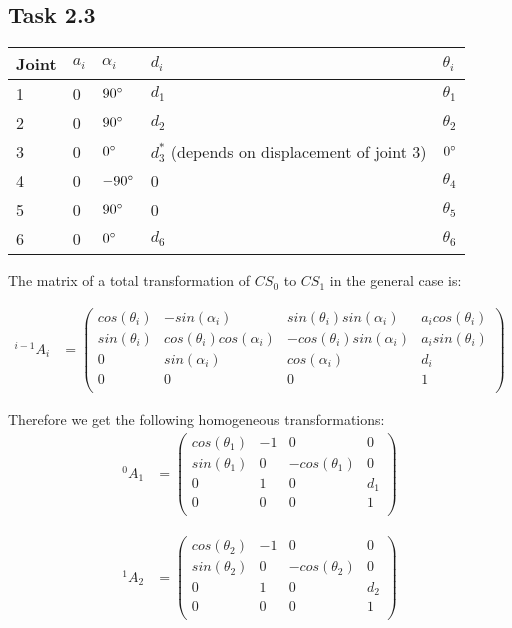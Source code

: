 \subsection*{Task 2.3}

\begin{center}
	\begin{tabular}{ | l | l | l | l | l |}
		\hline
		Joint & $a_{i}$ & $\alpha_{i}$ & $d_i$ & $\theta_i$ \\ \hline
		1 & 0 & $90\degree$ & $d_1$ & $\theta_1$\\ \hline
		2 & 0 & $90\degree$ & $d_2$ & $\theta_2$\\ \hline
		3 & 0 & $0\degree$ & $d^*_3$ (depends on displacement of joint 3) & $0\degree$\\ \hline
		4 & 0 & $-90\degree$ & 0 & $\theta_4$\\ \hline
		5 & 0 & $90\degree$ & 0 & $\theta_5$\\ \hline
		6 & 0 & $0\degree$ & $d_6$ & $\theta_6$\\ \hline
	\end{tabular}
\end{center}

The matrix of a total transformation of $CS_0$ to $CS_1$ in the general case is:

\begin{align*}
^{i-1}A_i &= 
\begin{pmatrix}
cos(\theta_i) & -sin(\alpha_i) & sin(\theta_i)sin(\alpha_i) & a_icos(\theta_i) \\
sin(\theta_i) & cos(\theta_i)cos(\alpha_i) & -cos(\theta_i)sin(\alpha_i) & a_isin(\theta_i) \\
0 & sin(\alpha_i) & cos(\alpha_i) & d_i \\
0 & 0 & 0 & 1 \\
\end{pmatrix}
\end{align*}

Therefore we get the following homogeneous transformations:
\begin{align*}
^{0}A_1 &= 
\begin{pmatrix}
cos(\theta_1) & -1 & 0 & 0 \\
sin(\theta_1) & 0 & -cos(\theta_1) & 0 \\
0 & 1 & 0 & d_1 \\
0 & 0 & 0 & 1 \\
\end{pmatrix}
\end{align*}

\begin{align*}
^{1}A_2 &= 
\begin{pmatrix}
cos(\theta_2) & -1 & 0 & 0 \\
sin(\theta_2) & 0 & -cos(\theta_2) & 0 \\
0 & 1 & 0 & d_2 \\
0 & 0 & 0 & 1 \\
\end{pmatrix}
\end{align*}


